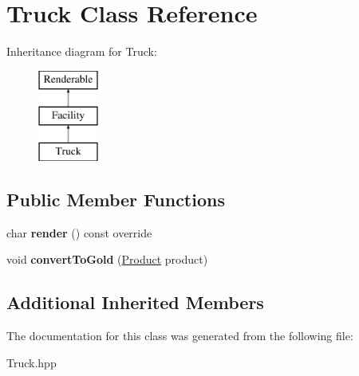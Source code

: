 \hypertarget{class_truck}{}\section{Truck Class Reference}
\label{class_truck}
Inheritance diagram for Truck\+:\begin{figure}[H]
\begin{center}
\leavevmode
\includegraphics[height=3.000000cm]{class_truck}
\end{center}
\end{figure}
\subsection*{Public Member Functions}
\begin{DoxyCompactItemize}
\item 
\mbox{\label{class_truck_afd75ba37af1154ccf9cb12d44eb57c78}} 
char {\bfseries render} () const override
\item 
\mbox{\label{class_truck_a0d7b872068034adec40acbd79f932762}} 
void {\bfseries convert\+To\+Gold} (\mbox{\hyperlink{class_product}{Product}} product)
\end{DoxyCompactItemize}
\subsection*{Additional Inherited Members}


The documentation for this class was generated from the following file\+:\begin{DoxyCompactItemize}
\item 
Truck.\+hpp\end{DoxyCompactItemize}
